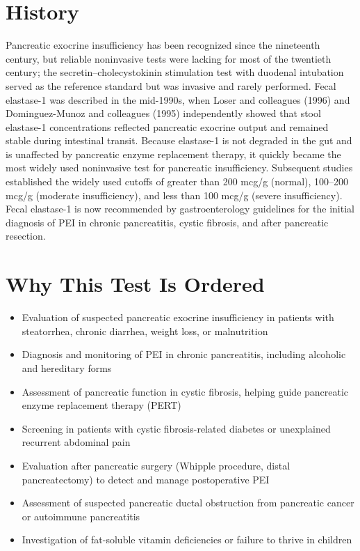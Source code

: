 \section*{History}
Pancreatic exocrine insufficiency has been recognized since the nineteenth century, but reliable noninvasive tests were lacking for most of the twentieth century; the secretin--cholecystokinin stimulation test with duodenal intubation served as the reference standard but was invasive and rarely performed. Fecal elastase-1 was described in the mid-1990s, when Loser and colleagues (1996) and Dominguez-Munoz and colleagues (1995) independently showed that stool elastase-1 concentrations reflected pancreatic exocrine output and remained stable during intestinal transit. Because elastase-1 is not degraded in the gut and is unaffected by pancreatic enzyme replacement therapy, it quickly became the most widely used noninvasive test for pancreatic insufficiency. Subsequent studies established the widely used cutoffs of greater than 200 mcg/g (normal), 100--200 mcg/g (moderate insufficiency), and less than 100 mcg/g (severe insufficiency). Fecal elastase-1 is now recommended by gastroenterology guidelines for the initial diagnosis of PEI in chronic pancreatitis, cystic fibrosis, and after pancreatic resection.
\section*{Why This Test Is Ordered}
\begin{itemize}
  \item Evaluation of suspected pancreatic exocrine insufficiency in patients with steatorrhea, chronic diarrhea, weight loss, or malnutrition
  \item Diagnosis and monitoring of PEI in chronic pancreatitis, including alcoholic and hereditary forms
  \item Assessment of pancreatic function in cystic fibrosis, helping guide pancreatic enzyme replacement therapy (PERT)
  \item Screening in patients with cystic fibrosis-related diabetes or unexplained recurrent abdominal pain
  \item Evaluation after pancreatic surgery (Whipple procedure, distal pancreatectomy) to detect and manage postoperative PEI
  \item Assessment of suspected pancreatic ductal obstruction from pancreatic cancer or autoimmune pancreatitis
  \item Investigation of fat-soluble vitamin deficiencies or failure to thrive in children
\end{itemize}
